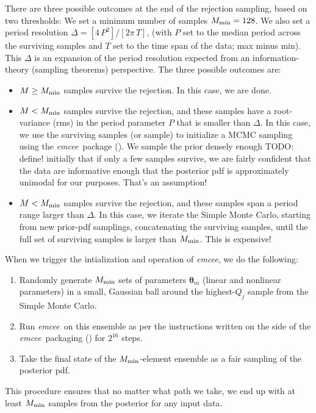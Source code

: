 \documentclass[manuscript, letterpaper]{aastex6}
\newcommand{\project}[1]{\textsl{#1}}
\newcommand{\emcee}{\project{emcee}}
\newcommand{\bs}[1]{\boldsymbol{#1}}
\newcommand{\todo}[1]{{\color{red}TODO: #1}}
\begin{document}
There are three possible outcomes at the end of the rejection
sampling, based on two thresholds:
We set a minimum number of samples $M_{\rm min}=128$.
We also set a period resolution $\Delta = [4\,P^2] / [2\pi\,T]$, (with
$P$ set to the median period across the surviving samples and $T$ set to
the time span of the data; max minus min).
This $\Delta$ is an expansion of the period
resolution expected from an information-theory (sampling theorems) perspective.
The three possible outcomes are:
\begin{itemize}\itemsep0ex
\item $M\geq M_{\rm min}$ samples survive the rejection.
  In this case, we are done.
\item $M<M_{\rm min}$ samples survive the rejection, and these samples
  have a root-variance (rms) in the period parameter $P$ that is
  smaller than $\Delta$.
  In this case, we use the surviving samples (or sample) to
  initialize a MCMC sampling using the \emcee\ package
  (\citealt{Foreman-Mackey:2013}).
  We sample the
  prior densely enough \todo{define!} initially that if only a few samples survive,
  we are fairly confident that the data are informative enough that
  the posterior pdf is approximately unimodal for our purposes. That's
  an assumption!
\item $M<M_{\rm min}$ samples survive the rejection, and these samples
  span a period range larger than $\Delta$.
  In this case, we iterate the Simple
  Monte Carlo, starting from new prior-pdf samplings, concatenating
  the surviving samples, until the full set of surviving samples is
  larger than $M_{\rm min}$. This is expensive!
\end{itemize}
When we trigger the intialization and operation of \emcee, we do the following:
\begin{enumerate}\itemsep0ex
\item Randomly generate $M_{\rm min}$ sets of parameters $\bs{\theta}_m$
  (linear and nonlinear parameters) in a small, Gaussian ball around
  the highest-$Q_j$ sample from the Simple Monte Carlo.
\item Run \emcee\ on this ensemble as per the instructions written on the side
  of the \emcee\ packaging (\citealt{Foreman-Mackey:2013}) for $2^{16}$ steps.
\item Take the final state of the $M_{\rm min}$-element ensemble as a
  fair sampling of the posterior pdf.
\end{enumerate}
This procedure ensures that no matter what path we take, we end up with
at least $M_{\rm min}$ samples from the posterior for any input data.
\end{document}
